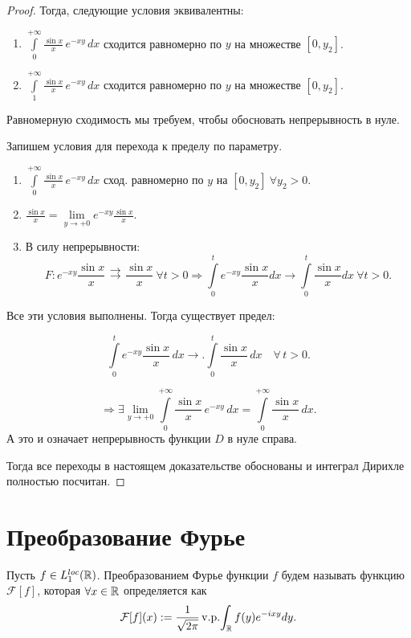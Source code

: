 \begin{proof}
\noindent Тогда, следующие условия эквивалентны: 

\begin{enumerate}
    \item \(\int\limits_0^{+\infty} \frac{\sin x}{x} \, e^{-x y} \, dx \) сходится равномерно по \( y \) на множестве \( [0, y_2] \).
    
    \item \(\int\limits_1^{+\infty} \frac{\sin x}{x} \, e^{-x y} \, dx \) сходится равномерно по \( y \) на множестве \( [0, y_2] \).
\end{enumerate}

\noindent Равномерную сходимость мы требуем, чтобы обосновать непрерывность в нуле. 

\noindent Запишем условия для перехода к пределу по параметру. 

\begin{enumerate}
    \item $\int\limits_0^{+\infty} \frac{\sin x}{x} \, e^{-x y} \, dx$ сход. равномерно по $y$ на $[0, y_2 ] \ \forall y_2 > 0.$

    \item $\frac{\sin x}{x} = \lim\limits_{y \to +0} e^{-x y} \frac{\sin x}{x}.$


    \item В силу непрерывности: 
    $$
    F: e^{-x y} \frac{\sin x}{x} \mathrel{\substack{\rightrightarrows \\ [0, t]}} \dfrac{\sin x}{x}  \ \forall t > 0 \Rightarrow \int\limits_{0}^{t} e^{-xy} \dfrac{\sin x}{x} dx \rightarrow \int\limits_{0}^{t} \dfrac{\sin x}{x} dx \ \forall t > 0.
    $$
    
\end{enumerate}

\noindent Все эти условия выполнены. Тогда существует предел: 

\[
\int\limits_0^{t} e^{-x y} \frac{\sin x}{x} \, dx 
\longrightarrow.
\int\limits_0^{t} \frac{\sin x}{x} \, dx \quad \forall\, t > 0.
\]


\[
\Rightarrow \exists \lim_{y \to +0} \int\limits_0^{+\infty} \frac{\sin x}{x} \, e^{-x y} \, dx 
= \int\limits_0^{+\infty} \frac{\sin x}{x} \, dx.
\]
А это и означает непрерывность функции $D$ в нуле справа.

\noindent Тогда  все переходы в настоящем доказательстве обоснованы и интеграл Дирихле полностью посчитан. 

\end{proof}


\section{Преобразование Фурье}
\begin{definition}
Пусть $f \in L_1^{loc}(\mathbb{R})$.
Преобразованием Фурье функции $f$ будем называть функцию $\mathcal{F}[f]$, которая $\forall x \in \mathbb{R}$ определяется как
\[
    \mathcal{F}[f](x) := \dfrac{1}{\sqrt {2\pi}}\mathop{\mathrm{v.p.}}\!\int_{\mathbb{R}} f(y)e^{-ixy}dy.
\]
\end{definition}

